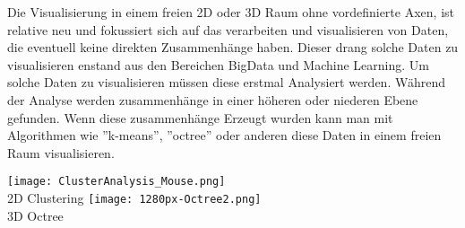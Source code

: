 \begin{itemize}
        Die Visualisierung in einem freien 2D oder 3D Raum ohne vordefinierte Axen, ist relative neu und fokussiert sich auf das verarbeiten
        und visualisieren von Daten, die eventuell keine direkten Zusammenhänge haben. Dieser drang solche Daten zu visualisieren
        enstand aus den Bereichen BigData und Machine Learning. Um solche Daten zu visualisieren müssen diese erstmal Analysiert
        werden. Während der Analyse werden zusammenhänge in einer höheren oder niederen Ebene gefunden. Wenn diese zusammenhänge Erzeugt
        wurden kann man mit Algorithmen wie ''k-means'', ''octree'' oder anderen diese Daten in einem freien Raum visualisieren.
        \begin{center}
            \texttt{[image: ClusterAnalysis\_Mouse.png]}\cite{2dclustering}\\
            2D Clustering
            \texttt{[image: 1280px-Octree2.png]}\cite{wikioctree}\\
            3D Octree
        \end{center}
\end{itemize}

